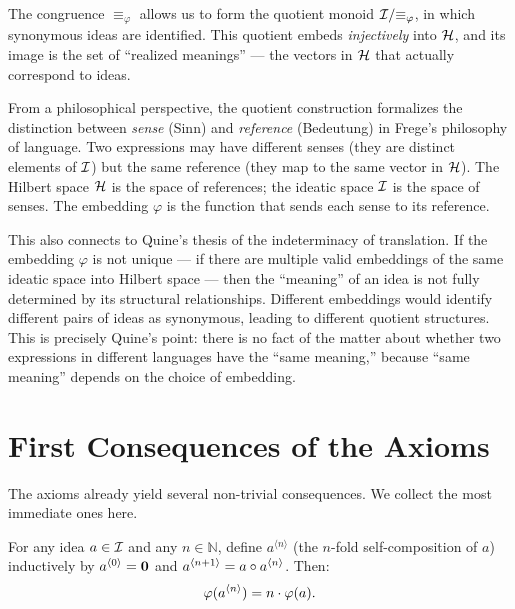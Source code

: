 \begin{interpretation}
\label{interp:synonymy}
The congruence $\equiv_\varphi$ allows us to form the quotient monoid $\mathcal{I} /
{\equiv_\varphi}$, in which synonymous ideas are identified. This quotient
embeds \emph{injectively} into $\mathcal{H}$, and its image is the set of ``realized
meanings'' --- the vectors in $\mathcal{H}$ that actually correspond to ideas.

From a philosophical perspective, the quotient construction formalizes the
distinction between \emph{sense} (Sinn) and \emph{reference} (Bedeutung) in
Frege's philosophy of language. Two expressions may have different senses (they
are distinct elements of $\mathcal{I}$) but the same reference (they map to the same
vector in $\mathcal{H}$). The Hilbert space $\mathcal{H}$ is the space of references;
the ideatic space $\mathcal{I}$ is the space of senses. The embedding $\varphi$ is the
function that sends each sense to its reference.

This also connects to Quine's thesis of the indeterminacy of translation. If
the embedding $\varphi$ is not unique --- if there are multiple valid embeddings
of the same ideatic space into Hilbert space --- then the ``meaning'' of an idea
is not fully determined by its structural relationships. Different embeddings
would identify different pairs of ideas as synonymous, leading to different
quotient structures. This is precisely Quine's point: there is no fact of the
matter about whether two expressions in different languages have the ``same
meaning,'' because ``same meaning'' depends on the choice of embedding.
\end{interpretation}


\section{First Consequences of the Axioms}

The axioms already yield several non-trivial consequences. We collect the most
immediate ones here.

\begin{proposition}
\label{prop:iterated-compose}
For any idea $a \in \mathcal{I}$ and any $n \in \mathbb{N}$, define $a^{\langle n
\rangle}$ (the $n$-fold self-composition of $a$) inductively by $a^{\langle 0
\rangle} = \mathbf{0}$ and $a^{\langle n+1 \rangle} = a \circ a^{\langle n
\rangle}$. Then:
\[
  \varphi(a^{\langle n \rangle}) = n \cdot \varphi(a).
\]
\end{proposition}

